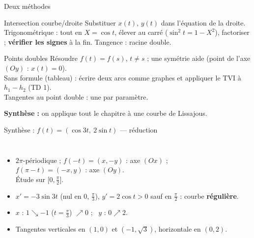 \documentclass[aspectratio=169,11pt]{beamer}
\begin{document}
\begin{frame}{Deux méthodes}
\begin{METH}{Intersection courbe/droite}
Substituer $x(t)$, $y(t)$ dans l'équation de la droite. Trigonométrique : tout en $X=\cos t$, élever au carré
($\sin^2t=1-X^2$), factoriser ; \textbf{vérifier les signes} à la fin. Tangence : racine double.
\end{METH}
\pause
\begin{METH}{Points doubles}
Résoudre $f(t)=f(s)$, $t\neq s$ ; une symétrie aide (point de l'axe $(Oy)$ : $x(t)=0$).\\
Sans formule (tableau) : écrire deux arcs comme graphes et appliquer le TVI à $h_1-h_2$ (TD 1).\\
Tangentes au point double : une par paramètre.
\end{METH}
\pause
\textbf{Synthèse :} on applique tout le chapitre à une courbe de Lissajous.
\end{frame}

\begin{frame}{Synthèse : $f(t)=(\cos3t,\ 2\sin t)$ --- réduction}
\begin{columns}[c]
\begin{itemize}
\item $2\pi$-périodique ; $f(-t)=(x,-y)$ : axe $(Ox)$ ;\\ $f(\pi-t)=(-x,y)$ : axe $(Oy)$.\\
      Étude sur $\big[0,\frac\pi2\big]$.
\pause
\item $x'=-3\sin3t$ (nul en $0$, $\frac\pi3$), $y'=2\cos t>0$ sauf en $\frac\pi2$ : courbe \textbf{régulière}.
\pause
\item $x$ : $1\searrow-1$ ($t=\frac\pi3$) $\nearrow0$ ; \ $y$ : $0\nearrow2$.
\item Tangentes verticales en $(1,0)$ et $(-1,\sqrt3)$, horizontale en $(0,2)$.
\end{itemize}
\centering{}
\end{columns}
\end{frame}
\end{document}
